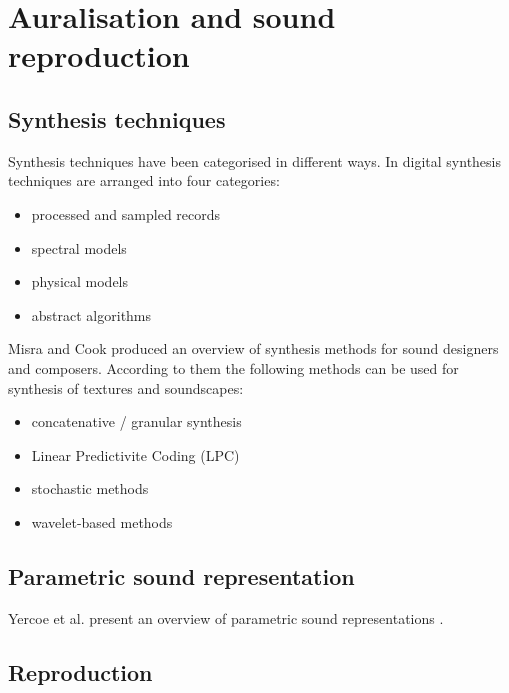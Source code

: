 \section{Auralisation and sound reproduction}

\subsection{Synthesis techniques}
Synthesis techniques have been categorised in different ways. In \cite{JuliusO.Smith} digital synthesis techniques are arranged into four categories:
\begin{itemize}
 \item processed and sampled records
 \item spectral models
 \item physical models
 \item abstract algorithms
\end{itemize}

Misra and Cook produced an overview of synthesis methods for sound designers and 
composers.
According to them the following methods can be used for synthesis of textures 
and soundscapes:
\begin{itemize}
 \item concatenative / granular synthesis
 \item Linear Predictivite Coding (LPC)
 \item stochastic methods
 \item wavelet-based methods
\end{itemize}


\subsection{Parametric sound representation}
Yercoe et al. present an overview of parametric sound representations \cite{Vercoe1998}.

\subsection{Reproduction}


